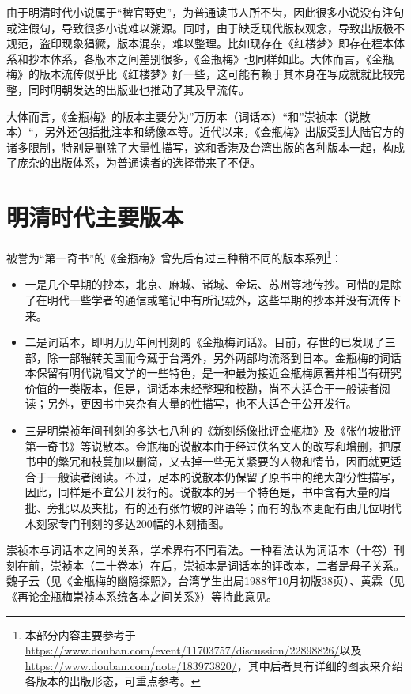 由于明清时代小说属于“稗官野史”，为普通读书人所不齿，因此很多小说没有注句或注假句，导致很多小说难以溯源。同时，由于缺乏现代版权观念，导致出版极不规范，盗印现象猖獗，版本混杂，难以整理。比如现存在《红楼梦》即存在程本体系和抄本体系，各版本之间差别很多，《金瓶梅》也同样如此。大体而言，《金瓶梅》的版本流传似乎比《红楼梦》好一些，这可能有赖于其本身在写成就就比较完整，同时明朝发达的出版业也推动了其及早流传。

大体而言，《金瓶梅》的版本主要分为”万历本（词话本）“和”崇祯本（说散本）“，另外还包括批注本和绣像本等。近代以来，《金瓶梅》出版受到大陆官方的诸多限制，特别是删除了大量性描写，这和香港及台湾出版的各种版本一起，构成了庞杂的出版体系，为普通读者的选择带来了不便。

\section{明清时代主要版本}
被誉为“第一奇书”的《金瓶梅》曾先后有过三种稍不同的版本系列\footnote{本部分内容主要参考于\url{https://www.douban.com/event/11703757/discussion/22898826/}以及\url{https://www.douban.com/note/183973820/}，其中后者具有详细的图表来介绍各版本的出版形态，可重点参考。}：
\begin{itemize}
	\item 一是几个早期的抄本，北京、麻城、诸城、金坛、苏州等地传抄。可惜的是除了在明代一些学者的通信或笔记中有所记载外，这些早期的抄本并没有流传下来。
	\item 二是词话本，即明万历年间刊刻的《金瓶梅词话》。目前，存世的已发现了三部，除一部辗转美国而今藏于台湾外，另外两部均流落到日本。金瓶梅的词话本保留有明代说唱文学的一些特色，是一种最为接近金瓶梅原著并相当有研究价值的一类版本，但是，词话本未经整理和校勘，尚不大适合于一般读者阅读；另外，更因书中夹杂有大量的性描写，也不大适合于公开发行。
	\item 三是明崇祯年间刊刻的多达七八种的《新刻绣像批评金瓶梅》及《张竹坡批评第一奇书》等说散本。金瓶梅的说散本由于经过佚名文人的改写和增删，把原书中的繁冗和枝蔓加以删简，又去掉一些无关紧要的人物和情节，因而就更适合于一般读者阅读。不过，足本的说散本仍保留了原书中的绝大部分性描写，因此，同样是不宜公开发行的。说散本的另一个特色是，书中含有大量的眉批、旁批以及夹批，有的还有张竹坡的评语等；而有的版本更配有由几位明代木刻家专门刊刻的多达200幅的木刻插图。
\end{itemize}

崇祯本与词话本之间的关系，学术界有不同看法。一种看法认为词话本（十卷）刊刻在前，崇祯本（二十卷本）在后，崇祯本是词话本的评改本，二者是母子关系。魏子云（见《金瓶梅的幽隐探照》，台湾学生出局1988年10月初版38页）、黄霖（见《再论金瓶梅崇祯本系统各本之间关系》）等持此意见。 

